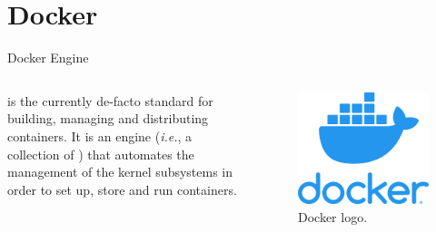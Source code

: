 
\section{Docker}
\graphicspath{{figs/section5/}}

\begin{frame}{Docker Engine}
	\begin{columns}
		 is the currently de-facto standard for building, managing and distributing  containers.
		\newline\newline
		It is an engine (\emph{i.e.}, a collection of ) that automates the management of the kernel subsystems in order to set up, store and run containers.

		\begin{figure}
			\centering
			\label{fig:docker}
			\includegraphics[scale=.2]{docker.png}
			\caption{Docker logo.}
		\end{figure}
	\end{columns}
\end{frame}
